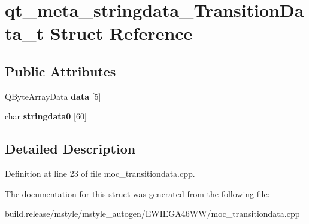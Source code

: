 \hypertarget{structqt__meta__stringdata___transition_data__t}{}\section{qt\+\_\+meta\+\_\+stringdata\+\_\+\+Transition\+Data\+\_\+t Struct Reference}
\label{structqt__meta__stringdata___transition_data__t}
\subsection*{Public Attributes}
\begin{DoxyCompactItemize}
\item 
\mbox{\label{structqt__meta__stringdata___transition_data__t_a8b79a94e4a5fc755124896fb3510aa30}} 
Q\+Byte\+Array\+Data {\bfseries data} \mbox{[}5\mbox{]}
\item 
\mbox{\label{structqt__meta__stringdata___transition_data__t_aed2a8b8fc4fdeffb9d49a54228524a69}} 
char {\bfseries stringdata0} \mbox{[}60\mbox{]}
\end{DoxyCompactItemize}


\subsection{Detailed Description}


Definition at line 23 of file moc\+\_\+transitiondata.\+cpp.



The documentation for this struct was generated from the following file\+:\begin{DoxyCompactItemize}
\item 
build.\+release/mstyle/mstyle\+\_\+autogen/\+E\+W\+I\+E\+G\+A46\+W\+W/moc\+\_\+transitiondata.\+cpp\end{DoxyCompactItemize}
